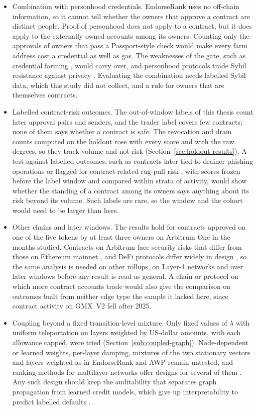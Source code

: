 \begin{itemize}
\item Combination with personhood credentials. EndorseRank uses no off-chain information, so it cannot tell whether the owners that approve a contract are distinct people. Proof of personhood does not apply to a contract, but it does apply to the externally owned accounts among its owners. Counting only the approvals of owners that pass a Passport-style check \parencite{humanpassportnddocs} would make every farm address cost a credential as well as gas. The weaknesses of the gate, such as credential farming \parencite{bordeianu2026sybil}, would carry over, and personhood protocols trade Sybil resistance against privacy \parencite{siddarth2020watchmen}. Evaluating the combination needs labelled Sybil data, which this study did not collect, and a rule for owners that are themselves contracts.
\item Labelled contract-risk outcomes. The out-of-window labels of this thesis count later approval pairs and senders, and the trader label covers few contracts; none of them says whether a contract is safe. The revocation and drain counts computed on the holdout rose with every score and with the raw degrees, so they track volume and not risk (Section~\ref{sec:holdout-results}). A test against labelled outcomes, such as contracts later tied to drainer phishing operations \parencite{he2025drainer} or flagged for contract-related rug-pull risk \parencite{lin2024crpwarner}, with scores frozen before the label window and compared within strata of activity, would show whether the standing of a contract among its owners says anything about its risk beyond its volume. Such labels are rare, so the window and the cohort would need to be larger than here.
\item Other chains and later windows. The results hold for contracts approved on one of the five tokens by at least three owners on Arbitrum One in the months studied. Contracts on Arbitrum face security risks that differ from those on Ethereum mainnet \parencite{tang2024arbitrum}, and DeFi protocols differ widely in design \parencite{werner2022sok}, so the same analysis is needed on other rollups, on Layer-1 networks and over later windows before any result is read as general. A chain or protocol on which more contract accounts trade would also give the comparison on outcomes built from neither edge type the sample it lacked here, since contract activity on GMX~V2 fell after 2025.
\item Coupling beyond a fixed transition-level mixture. Only fixed values of $\lambda$ with uniform teleportation on layers weighted by US-dollar amounts, with each allowance capped, were tried (Section~\ref{sub:coupled-graph}). Node-dependent or learned weights, per-layer damping, mixtures of the two stationary vectors and layers weighted as in EndorseRank and AWP remain untested, and ranking methods for multilayer networks offer designs for several of them \parencite{dedomenico2015ranking}. Any such design should keep the auditability that separates graph propagation from learned credit models, which give up interpretability to predict labelled defaults \parencite{kotb2023credit}.

\end{itemize}
